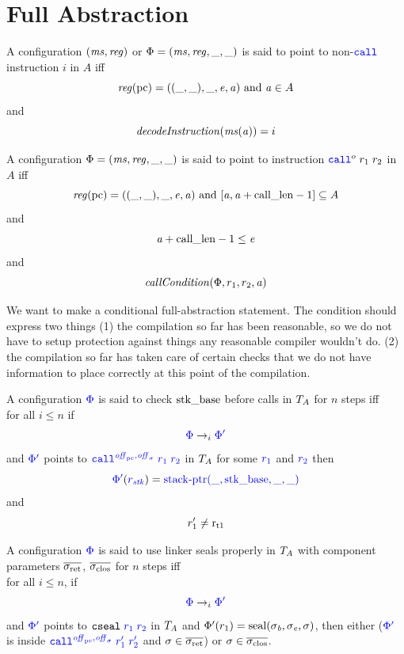 \documentclass[a4paper]{article}
\begin{document}
\begin{theorem}[FTLR]
\end{theorem}

\section{Full Abstraction}
\begin{definition}
  \label{def:points-to-instr}
  A configuration $(\ms,\reg)$ {\sourcecolor or $\Phi = (\ms,\reg,\_,\_)$} is said to point to non-$\scall{}{}{}$ instruction $i$ in $A$ iff
  \[
    \reg(\pcreg) = ((\_,\_),\_,\eaddr,\aaddr) \tand \aaddr \in A
  \]
and
\[
  \decInstr{\ms(\aaddr)} = i
\]
\end{definition}

\begin{definition}
  \label{def:points-to-call}
  A configuration {\sourcecolor $\Phi = (\ms,\reg,\_,\_)$} is said to point to instruction $\scall{o}{r_1}{r_2}$ in $A$ iff
  \[
    \reg(\pcreg) = ((\_,\_),\_,\eaddr,\aaddr) \tand [\aaddr,\aaddr+\calllen-1] \subseteq A
  \]
and
\[
  \aaddr+\calllen - 1 \leq \eaddr
\]
and
\[
  \callCond{\Phi,r_1,r_2,\aaddr}
\]
\end{definition}
We want to make a conditional full-abstraction statement. The condition should express two things (1) the compilation so far has been reasonable, so we do not have to setup protection against things any reasonable compiler wouldn't do. (2) the compilation so far has taken care of certain checks that we do not have information to place correctly at this point of the compilation.
\begin{definition}
  \label{def:check-stack-addr-before-call}
  A configuration $\src{\Phi}$ is said to check $\stkb$ before calls in $\ta$ for $n$ steps iff\\
  for all $i \leq n$ if
  \[
    \src{\Phi} \nstep[i] \src{\Phi'}
  \]
  and $\src{\Phi'}$ points to $\src{\scall{\offpc,\offsigma}{r_1}{r_2}}$ in $\ta$ for some $\src{r_1}$ and $\src{r_2}$
  then
  \[
    \src{\Phi'}(\src{r_\stk}) = \src{\stkptr{\_,\stkb,\_,\_}}
  \]
  and
  \[
    r_1' \neq \rtmp{1}
  \]
\end{definition}

\begin{definition}
  \label{def:use-return-seals-call}
  A configuration $\src{\Phi}$ is said to use linker seals properly in $\ta$ with component parameters $\sigrets$, $\sigcloss$ for $n$ steps iff\\
  for all $i \leq n$, if
  \[
    \src{\Phi} \nstep[i] \src{\Phi'}
  \]
  and $\src{\Phi'}$ points to $\src{\tcseal{r_1}{r_2}}$ in $\ta$ and $\Phi'(r_1) = \seal{\sigma_\baddr,\sigma_\eaddr,\sigma}$, then either ($\src{\Phi'}$ is inside $\src{\scall{\offpc,\offsigma}{r_1'}{r_2'}}$ and $\sigma \in \sigrets$) or $\sigma \in \sigcloss$.
\end{definition}
\end{document}
